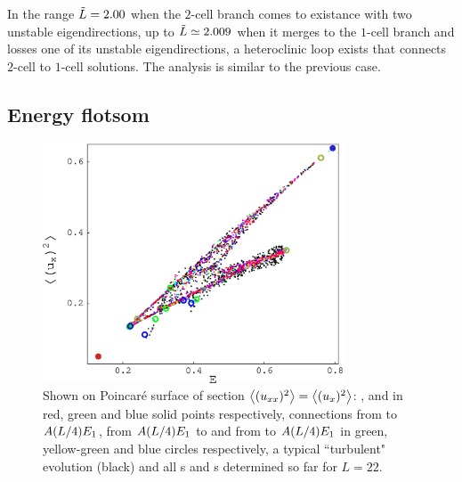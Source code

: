 {In the range $\tilde{L}=2.00$ when the $2$-cell branch comes to existance with two unstable eigendirections, up to $\tilde{L} \simeq 2.009$ when it
merges to the $1$-cell branch and losses one of its unstable eigendirections, a heteroclinic loop exists that connects $2$-cell to $1$-cell solutions.
The analysis is similar to the previous case.


\subsection*{Energy flotsom}


\begin{figure}[t] \label{f:drivedragPoinc}
\begin{center}
    \includegraphics[width=0.8\textwidth]{figs/energyPoinc.eps}
\end{center}
\caption{
Shown on Poincar\'{e} surface of section 
$\left\langle {(u_{xx})^2} \right\rangle = \left\langle {(u_{x})^2} \right\rangle$:
,  and  in red, green and blue solid points respectively,
connections from  to $A(L/4)E_{1}$,
from $A(L/4)E_{1}$ to  and from  to $A(L/4)E_{1}$ in green, 
yellow-green and blue circles respectively,
a typical ``turbulent" evolution (black) and all \po s and \rpo s 
determined so far for $L=22$.
        }
\end{figure}




}
